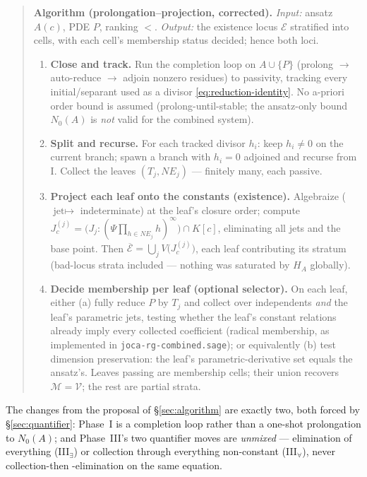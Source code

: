 \documentclass[11pt]{article}
\newcommand{\Psib}{\Psi}
\newcommand{\Var}{\mathcal{V}}
\newcommand{\Mem}{\mathcal{M}}
\newcommand{\Ex}{\mathcal{E}}
\newcommand{\code}[1]{\texttt{#1}}
\begin{document}
\begin{quote}
\textbf{Algorithm (prolongation--projection, corrected).}
\emph{Input:} ansatz $A(c)$, PDE $P$, ranking $<$.
\emph{Output:} the existence locus $\Ex$ stratified into cells, with each
cell's membership status decided; hence both loci.
\begin{enumerate}
\item[\textbf{I.}] \textbf{Close and track.} Run the completion loop on
  $A\cup\{P\}$ (prolong $\to$ auto-reduce $\to$ adjoin nonzero residues) to
  passivity, tracking every initial/separant used as a divisor
  \eqref{eq:reduction-identity}. No a-priori order bound is assumed
  (prolong-until-stable; the ansatz-only bound $N_0(A)$ is \emph{not} valid
  for the combined system).
\item[\textbf{II.}] \textbf{Split and recurse.} For each tracked divisor
  $h_i$: keep $h_i \ne 0$ on the current branch; spawn a branch with
  $h_i = 0$ adjoined and recurse from I. Collect the leaves
  $(T_j, NE_j)$ --- finitely many, each passive.
\item[\textbf{III$_\exists$.}] \textbf{Project each leaf onto the constants
  (existence).} Algebraize ($\text{jet} \mapsto$ indeterminate) at the leaf's
  closure order; compute
  $J_c^{(j)} = \bigl(J_j : (\Psib\prod_{h\in NE_j}h)^\infty\bigr)\cap K[c]$,
  eliminating all jets and the base point. Then
  $\overline{\Ex} = \bigcup_j V\bigl(J_c^{(j)}\bigr)$, each leaf contributing
  its stratum (bad-locus strata included --- nothing was saturated by $H_A$
  globally).
\item[\textbf{III$_\forall$.}] \textbf{Decide membership per leaf
  (optional selector).} On each leaf, either (a) fully reduce $P$ by $T_j$
  and collect over independents \emph{and} the leaf's parametric jets,
  testing whether the leaf's constant relations already imply every collected
  coefficient (radical membership, as implemented in
  \code{joca-rg-combined.sage}); or equivalently (b) test dimension
  preservation: the leaf's parametric-derivative set equals the ansatz's.
  Leaves passing are membership cells; their union recovers $\Mem = \Var$;
  the rest are partial strata.
\end{enumerate}
\end{quote}

The changes from the proposal of \S\ref{sec:algorithm} are exactly two, both
forced by \S\ref{sec:quantifier}: Phase~I is a completion loop rather than a
one-shot prolongation to $N_0(A)$; and Phase~III's two quantifier moves are
\emph{unmixed} --- elimination of everything (III$_\exists$) or collection
through everything non-constant (III$_\forall$), never collection-then%
-elimination on the same equation.
\end{document}
